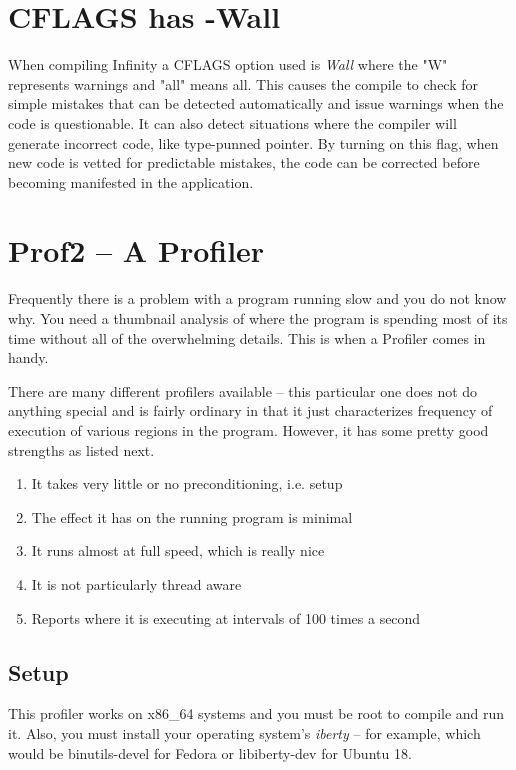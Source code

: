 \section{CFLAGS has -Wall}
\label{sec:cflags_has_-wall}
When compiling \CGG{} Infinity a CFLAGS option used is \textit{Wall} where the "W" represents warnings and "all" means all.  This causes the compile to check for simple mistakes that can be detected automatically and issue warnings when the code is questionable.  It can also detect situations where the compiler will generate incorrect code, like type-punned pointer.  By turning on this flag, when new code is vetted for predictable mistakes, the code can be corrected before becoming manifested in the application.

\section{Prof2 -- A Profiler}
\label{sec:prof2_profiler}

Frequently there is a problem with a program running slow and you do not know why. You need a thumbnail analysis of where the program is spending most of its time without all of the overwhelming details. This is when a Profiler comes in handy.

There are many different profilers available -- this particular one does not do anything special and is fairly ordinary in that it just characterizes frequency of execution of various regions in the program. However, it has some pretty good strengths as listed next.

\begin{enumerate}[nosep]
	\item It takes very little or no preconditioning, i.e. setup
	\item The effect it has on the running program is minimal
	\item It runs almost at full speed, which is really nice
	\item It is not particularly thread aware
	\item Reports where it is executing at intervals of 100 times a second
\end{enumerate}

\subsection{Setup}
\label{sub:setup}

This profiler works on x86\_64 systems and you must be root to compile and run it. Also, you must install your operating system's \textit{iberty} -- for example, which would be binutils-devel for Fedora or libiberty-dev for Ubuntu 18.

